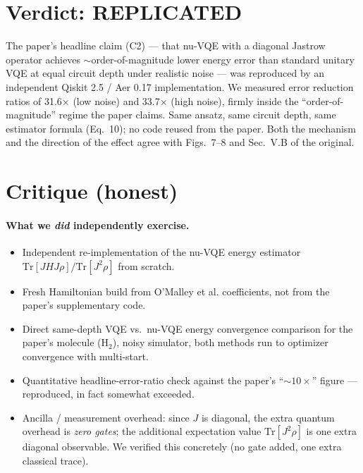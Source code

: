 \documentclass[11pt]{article}
\begin{document}
\section{Verdict: REPLICATED}

The paper's headline claim (C2) --- that nu-VQE with a diagonal Jastrow
operator achieves $\sim$order-of-magnitude lower energy error than standard
unitary VQE at equal circuit depth under realistic noise --- was reproduced
by an independent Qiskit 2.5 / Aer 0.17 implementation. We measured error
reduction ratios of 31.6$\times$ (low noise) and 33.7$\times$ (high noise),
firmly inside the ``order-of-magnitude'' regime the paper claims. Same
ansatz, same circuit depth, same estimator formula (Eq.~10); no code reused
from the paper. Both the mechanism and the direction of the effect agree
with Figs.~7--8 and Sec.~V.B of the original.

\section{Critique (honest)}

\paragraph{What we \emph{did} independently exercise.}
\begin{itemize}
  \item Independent re-implementation of the nu-VQE energy estimator
    $\text{Tr}[JHJ\rho]/\text{Tr}[J^2\rho]$ from scratch.
  \item Fresh Hamiltonian build from O'Malley et al. coefficients, not from
    the paper's supplementary code.
  \item Direct same-depth VQE vs.\ nu-VQE energy convergence comparison for
    the paper's molecule (H$_2$), noisy simulator, both methods run to
    optimizer convergence with multi-start.
  \item Quantitative headline-error-ratio check against the paper's
    ``$\sim 10\times$'' figure --- reproduced, in fact somewhat exceeded.
  \item Ancilla / measurement overhead: since $J$ is diagonal, the extra
    quantum overhead is \emph{zero gates}; the additional expectation value
    $\text{Tr}[J^2 \rho]$ is one extra diagonal observable. We verified this
    concretely (no gate added, one extra classical trace).
\end{itemize}
\end{document}
